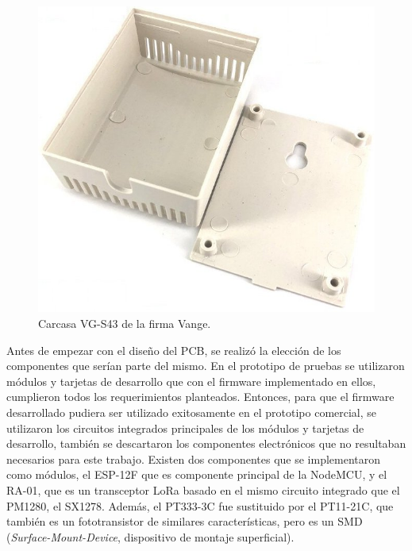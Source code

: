 \begin{figure}[h]
	\centering
	\includegraphics[scale=0.4]{./Figures/case.jpg}
	\caption{Carcasa VG-S43 de la firma Vange\protect\footnotemark.}
		\label{fig:case}
\end{figure}


Antes de empezar con el diseño del PCB, se realizó la elección de los componentes que serían parte del mismo. En el prototipo de pruebas se utilizaron módulos y tarjetas de desarrollo que con el firmware implementado en ellos, cumplieron todos los requerimientos planteados. Entonces, para que el firmware desarrollado pudiera ser utilizado exitosamente en el prototipo comercial, se utilizaron los circuitos integrados principales de los módulos y tarjetas de desarrollo, también se descartaron los componentes electrónicos que no resultaban necesarios para este trabajo. Existen dos componentes que se implementaron como módulos, el ESP-12F que es componente principal de la NodeMCU, y el RA-01, que es un transceptor LoRa basado en el mismo circuito integrado que el PM1280, el SX1278. Además, el PT333-3C fue sustituido por el PT11-21C, que también es un fototransistor de similares características, pero es un SMD (\textit{Surface-Mount-Device}, dispositivo de montaje superficial).


